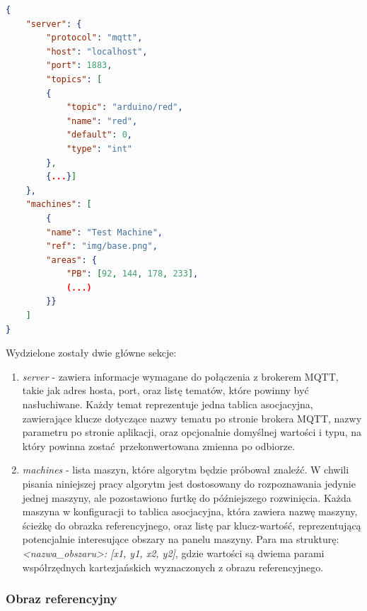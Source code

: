 \documentclass[12pt,twoside,polish]{article}
\begin{document}
\begin{lstlisting}[language=json,firstnumber=1,caption=Plik konfiguracyjny użyty w projekcie, label=ar_config]
{
	"server": {
		"protocol": "mqtt",
		"host": "localhost",
		"port": 1883,
		"topics": [
		{
			"topic": "arduino/red",
			"name": "red",
			"default": 0,
			"type": "int"
		},
		{...}]
	},
	"machines": [
		{
		"name": "Test Machine",
		"ref": "img/base.png",
		"areas": {
			"PB": [92, 144, 178, 233],
			(...)
		}}
	]
}
\end{lstlisting}

Wydzielone zostały dwie główne sekcje:

\begin{enumerate}[label=\alph*), leftmargin=1.25cm]
	\item \emph{server} - zawiera informacje wymagane do połączenia z brokerem MQTT, takie jak adres hosta, port, oraz listę tematów, które powinny być nasłuchiwane. Każdy temat reprezentuje jedna tablica asocjacyjna, zawierające klucze dotyczące nazwy tematu po stronie brokera MQTT, nazwy parametru po stronie aplikacji, oraz opcjonalnie domyślnej wartości i typu, na który powinna zostać przekonwertowana zmienna po odbiorze.
	\item \emph{machines} - lista maszyn, które algorytm będzie próbował znaleźć. W chwili pisania niniejszej pracy algorytm jest dostosowany do rozpoznawania jedynie jednej maszyny, ale pozostawiono furtkę do późniejszego rozwinięcia. Każda maszyna w konfiguracji to tablica asocjacyjna, która zawiera nazwę maszyny, ścieżkę do obrazka referencyjnego, oraz listę par klucz-wartość, reprezentującą potencjalnie interesujące obszary na panelu maszyny. Para ma strukturę: \emph{<nazwa\_obszaru>: [x1, y1, x2, y2]}, gdzie wartości są dwiema parami współrzędnych kartezjańskich wyznaczonych z obrazu referencyjnego.
\end{enumerate}

\subsubsection*{Obraz referencyjny}
\end{document}
